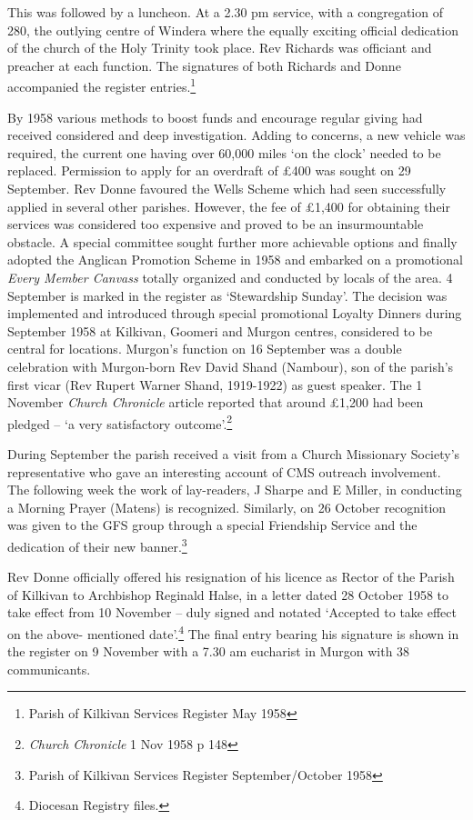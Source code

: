 This was followed by a luncheon. At a 2.30 pm service, with a congregation of 280, the outlying centre of Windera where the equally exciting official dedication of the church of the Holy Trinity took place. Rev Richards was officiant and preacher at each function. The signatures of both Richards and Donne accompanied the register entries.\footnote{Parish of Kilkivan Services Register May 1958}


By 1958 various methods to boost funds and encourage regular giving had received considered and deep investigation. Adding to concerns, a new vehicle was required, the current one having over 60,000 miles `on the clock' needed to be replaced. Permission to apply for an overdraft of \pounds400 was sought on 29 September. Rev Donne favoured the Wells Scheme which had seen successfully applied in several other parishes. However, the fee of \pounds1,400 for obtaining their services was considered too expensive and proved to be an insurmountable obstacle. A special committee sought further more achievable options and finally adopted the Anglican Promotion Scheme in 1958 and embarked on a promotional \emph{Every Member Canvass} totally organized and conducted by locals of the area. 4 September is marked in the register as `Stewardship Sunday'. The decision was implemented and introduced through special promotional Loyalty Dinners during September 1958 at Kilkivan, Goomeri and Murgon centres, considered to be central for locations. Murgon's function on 16 September was a double celebration with Murgon-born Rev David Shand (Nambour), son of the parish's first vicar (Rev Rupert Warner Shand, 1919-1922) as guest speaker. The 1 November \emph{Church Chronicle} article reported that around \pounds1,200 had been pledged -- `a very satisfactory outcome'.\footnote{\emph{Church Chronicle} 1 Nov 1958 p 148}


During September the parish received a visit from a Church Missionary Society's representative who gave an interesting account of CMS outreach involvement. The following week the work of lay-readers, J Sharpe and E Miller, in conducting a Morning Prayer (Matens) is recognized. Similarly, on 26 October recognition was given to the GFS group through a special Friendship Service and the dedication of their new banner.\footnote{Parish of Kilkivan Services Register September/October 1958}


Rev Donne officially offered his resignation of his licence as Rector of the Parish of Kilkivan to Archbishop Reginald Halse, in a letter dated 28 October 1958 to take effect from 10 November -- duly signed and notated `Accepted to take effect on the above- mentioned date'.\footnote{Diocesan Registry files.} The final entry bearing his signature is shown in the register on 9 November with a 7.30 am eucharist in Murgon with 38 communicants.


